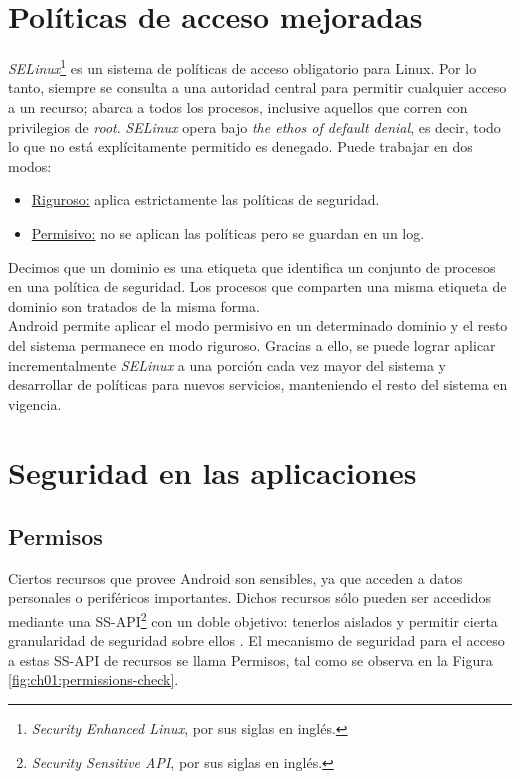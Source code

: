 \section{Políticas de acceso mejoradas}
\emph{SELinux}\footnote{\textit{Security Enhanced Linux}, por sus siglas en inglés.} es un sistema de políticas de acceso obligatorio para Linux. Por lo tanto, siempre se consulta a una autoridad central para permitir cualquier acceso a un recurso; abarca a todos los procesos, inclusive aquellos que corren con privilegios de \textit{root}. \emph{SELinux} opera bajo \textit{the ethos of default denial}, es decir, todo lo que no está explícitamente permitido es denegado. Puede trabajar en dos modos:
\begin{itemize}
    \item \underline{Riguroso:} aplica estrictamente las políticas de seguridad.
    \item \underline{Permisivo:} no se aplican las políticas pero se guardan en un log.
\end{itemize} 
Decimos que un dominio es una etiqueta que identifica un conjunto de procesos en una política de seguridad. Los procesos que comparten una misma etiqueta de dominio son tratados de la misma forma. \\

Android permite aplicar el modo permisivo en un determinado dominio y el resto del sistema permanece en modo riguroso. Gracias a ello, se puede lograr aplicar incrementalmente \emph{SELinux} a una porción cada vez mayor del sistema y desarrollar de políticas para nuevos servicios, manteniendo el resto del sistema en vigencia.
\section{Seguridad en las aplicaciones}
\subsection{Permisos} \label{ch01-permisos}
Ciertos recursos que provee Android son sensibles, ya que acceden a datos personales o periféricos importantes. Dichos recursos sólo pueden ser accedidos mediante una SS-API\footnote{\textit{Security Sensitive API}, por sus siglas en inglés.} con un doble objetivo: tenerlos aislados y permitir cierta granularidad de seguridad sobre ellos \cite{HYGZD2014}. El mecanismo de seguridad para el acceso a estas SS-API de recursos se llama Permisos, tal como se observa en la Figura \ref{fig:ch01:permissions-check}.\\

